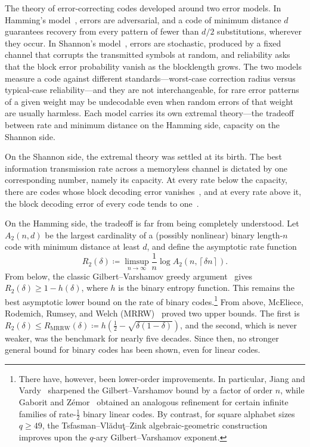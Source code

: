\documentclass[11pt]{article}
\renewcommand{\leq}{\leqslant}
\renewcommand{\geq}{\geqslant}
\theoremstyle{remark}
\newcommand{\MRRW}{R_{\mathrm{MRRW}}}
\newcommand{\ceil}[1]{\left\lceil #1 \right\rceil}
\begin{document}
The theory of error-correcting codes developed around two error models. In Hamming's model~\cite{Ham50}, errors are adversarial, and a code of minimum distance $d$ guarantees recovery from every pattern of fewer than $d/2$ substitutions, wherever they occur. In Shannon's model~\cite{Sha48}, errors are stochastic, produced by a fixed channel that corrupts the transmitted symbols at random, and reliability asks that the block error probability vanish as the blocklength grows. The two models measure a code against different standards---worst-case correction radius versus typical-case reliability---and they are not interchangeable, for rare error patterns of a given weight may be undecodable even when random errors of that weight are usually harmless. Each model carries its own extremal theory---the tradeoff between rate and minimum distance on the Hamming side, capacity on the Shannon side.

On the Shannon side, the extremal theory was settled at its birth. The best information transmission rate across a memoryless channel is dictated by one corresponding number, namely its capacity. At every rate below the capacity, there are codes whose block decoding error vanishes~\cite{Sha48}, and at every rate above it, the block decoding error of every code tends to one~\cite{Wol57,Str64,Ari73}.

On the Hamming side, the tradeoff is far from being completely understood. Let $A_2(n,d)$ be the largest cardinality of a (possibly nonlinear) binary length-$n$ code with minimum distance at least $d$, and define the asymptotic rate function
\begin{equation}
\label{eq:rate-function}
R_2(\delta) \coloneqq \limsup_{n \to \infty}\frac{1}{n}\log{A_2(n,\ceil{\delta n})}.
\end{equation}
From below, the classic Gilbert--Varshamov greedy argument~\cite{Gil52,Var57} gives $R_2(\delta) \geq 1-h(\delta)$, where $h$ is the binary entropy function. This remains the best asymptotic lower bound on the rate of binary codes.\footnote{There have, however, been lower-order improvements. In particular, Jiang and Vardy~\cite{JV04} sharpened the Gilbert--Varshamov bound by a factor of order $n$, while Gaborit and Z\'emor~\cite{GZ08} obtained an analogous refinement for certain infinite families of rate-$\frac{1}{2}$ binary linear codes. By contrast, for square alphabet sizes $q \geq 49$, the Tsfasman--Vl\u{a}du\c{t}--Zink algebraic-geometric construction~\cite{TVZ82} improves upon the $q$-ary Gilbert--Varshamov exponent.} From above, McEliece, Rodemich, Rumsey, and Welch (MRRW)~\cite{MRRW77} proved two upper bounds. The first is $R_2(\delta) \leq \MRRW(\delta) \coloneqq h\left(\frac{1}{2}-\sqrt{\delta(1-\delta)}\right)$, and the second, which is never weaker, was the benchmark for nearly five decades. Since then, no stronger general bound for binary codes has been shown, even for linear codes.
\end{document}

